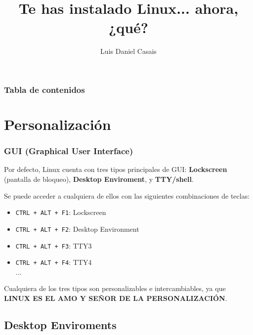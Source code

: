 \documentclass[aspectratio=43]{beamer}
\title{Te has instalado Linux... ahora, ¿qué?} %
\author{Luis Daniel Casais} %
\institute{\edicion \ Jornadas Técnicas del GUL}
\date{\fecha}
\begin{document}
{
    \begin{frame}
        \titlepage
    \end{frame}
}
\addtocounter{framenumber}{-1}


\begin{frame}
    \frametitle{Tabla de contenidos}
    \tableofcontents
\end{frame}


\section{Personalización}


\begin{frame}
    \frametitle{GUI (Graphical User Interface)}
    Por defecto, Linux cuenta con tres tipos principales de GUI: \textbf{Lockscreen} (pantalla de bloqueo), \textbf{Desktop Enviroment}, y \textbf{TTY/shell}.\newline

    Se puede acceder a cualquiera de ellos con las siguientes combinaciones de teclas:
    \begin{itemize}
        \item \texttt{CTRL + ALT + F1}: Lockscreen
        \item \texttt{CTRL + ALT + F2}: Desktop Environment
        \item \texttt{CTRL + ALT + F3}: TTY3
        \item \texttt{CTRL + ALT + F4}: TTY4\\
        ...\newline
    \end{itemize}
    
    Cualquiera de los tres tipos son personalizables e intercambiables, ya que \textbf{LINUX ES EL AMO Y SEÑOR DE LA PERSONALIZACIÓN}.
\end{frame}

\subsection{Desktop Enviroments}
\end{document}
